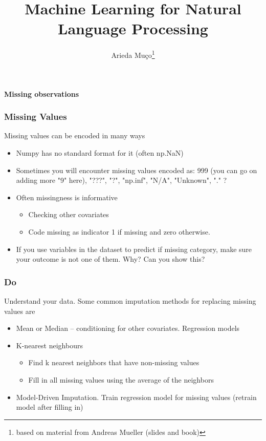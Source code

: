 \documentclass[compress, aspectratio=54]{beamer}
\title[ML for NLP ]{Machine Learning for Natural Language Processing}
\author[Arieda Mu\c co]{Arieda Mu\c co\footnote{based on material from Andreas Mueller (slides and book)}}
\institute[CEU]{Central European University}
\date{ }
\begin{document}
\captionsetup[subfigure]{labelformat=empty}

\frame{\titlepage}


\begin{frame}
\begin{center}
\Large{\textbf{Missing observations}}
\end{center}
\end{frame}

\begin{frame}
\frametitle{Missing Values}
Missing values can be encoded in many ways

\begin{itemize}
\item Numpy has no standard format for it (often np.NaN) 
\item Sometimes you will encounter missing values encoded as: 999 (you can go on adding more "9" here), "???", "?", "np.inf", "N/A", "Unknown", "." ?
\item Often missingness is informative
\begin{itemize}
\item Checking other covariates
\item Code missing as indicator 1 if missing and zero otherwise.
\end{itemize}
\item  If you use variables in the dataset to predict if missing category, make sure your outcome is not one of them. Why? Can you show this?
\end{itemize}

\end{frame}



\begin{frame}
\frametitle{Do }
Understand your data. Some common imputation methods for replacing missing values are
\begin{itemize}
\item Mean or Median -- conditioning for other covariates. Regression models

\item K-nearest neighbours
\begin{itemize}

\item  Find k nearest neighbors that have non-missing values

\item  Fill in all missing values using the average of the neighbors
\end{itemize}
\item Model-Driven Imputation. Train regression model for missing values (retrain model after filling in)


\end{itemize}
\end{frame}
\end{document}
